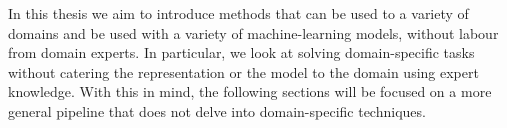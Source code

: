 In this thesis we aim to introduce methods that can be used to a variety of domains and be used with a variety of machine-learning models, without labour from domain experts. In particular, we look at solving domain-specific tasks without catering the representation or the model to the domain using expert knowledge. With this in mind, the following sections will be focused on a more general pipeline that does not delve into domain-specific techniques.

























